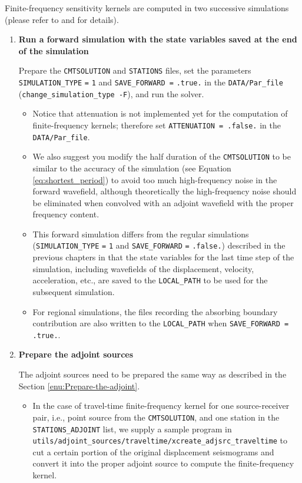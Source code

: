 Finite-frequency sensitivity kernels are computed in two successive
simulations (please refer to \citet{LiTr06} and \citet{TrKoLi08}
for details).
\begin{enumerate}
\item \textbf{Run a forward simulation with the state variables saved at
the end of the simulation}


Prepare the \texttt{\small CMTSOLUTION}{\small{} and }\texttt{\small STATIONS}{\small{}
files, set the parameters }\texttt{\small SIMULATION\_TYPE}{\small {}
}\texttt{\small =}{\small {} }\texttt{\small 1}{\small{} and }\texttt{\small SAVE\_FORWARD
=}{\small {} }\texttt{\small .true.}{\small{} in the }\texttt{DATA/Par\_file}{\small{}
(}\texttt{\small change\_simulation\_type -F}{\small ), and run the
solver.}{\small \par}
\begin{itemize}
\item Notice that attenuation is not implemented yet for the computation
of finite-frequency kernels; therefore set \texttt{ATTENUATION = .false.}
in the \texttt{DATA/Par\_file}.
\item We also suggest you modify the half duration of the \texttt{CMTSOLUTION}
to be similar to the accuracy of the simulation (see Equation \ref{eq:shortest_period})
to avoid too much high-frequency noise in the forward wavefield, although
theoretically the high-frequency noise should be eliminated when convolved
with an adjoint wavefield with the proper frequency content.
\item This forward simulation differs from the regular simulations (\texttt{\small SIMULATION\_TYPE}{\small {}
}\texttt{\small =}{\small {} }\texttt{\small 1}{\small{} and }\texttt{\small SAVE\_FORWARD}{\small {}
}\texttt{\small =}{\small {} }\texttt{\small .false.}{\small ) described
in the previous chapters in that the state variables for the last
time step of the simulation, including wavefields of the displacement,
velocity, acceleration, etc., are saved to the }\texttt{\small LOCAL\_PATH}{\small{}
to be used for the subsequent simulation. }{\small \par}
\item For regional simulations, the files recording the absorbing boundary
contribution are also written to the \texttt{LOCAL\_PATH} when \texttt{SAVE\_FORWARD
= .true.}.
\end{itemize}
\item \textbf{Prepare the adjoint sources}


The adjoint sources need to be prepared the same way as described
in the Section \ref{enu:Prepare-the-adjoint}.
\begin{itemize}
\item In the case of travel-time finite-frequency kernel for one source-receiver
pair, i.e., point source from the \texttt{CMTSOLUTION}, and one station
in the \texttt{STATIONS\_ADJOINT} list, we supply a sample program
in \texttt{utils/adjoint\_sources/traveltime/xcreate\_adjsrc\_traveltime}
to cut a certain portion of the original displacement seismograms
and convert it into the proper adjoint source to compute the finite-frequency
kernel.


\end{itemize}
\end{enumerate}
